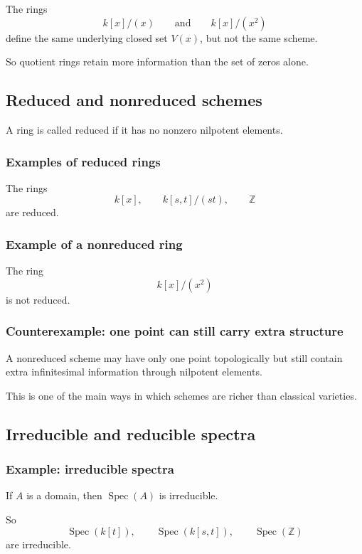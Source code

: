 \documentclass[12pt,a4paper]{article}
\theoremstyle{notespace}
\newcommand{\Spec}{\operatorname{Spec}}
\theoremstyle{definition}
\begin{document}
The rings
\[
k[x]/(x)
\qquad\text{and}\qquad
k[x]/(x^2)
\]
define the same underlying closed set \(V(x)\), but not the same scheme.

So quotient rings retain more information than the set of zeros alone.

\subsection{Reduced and nonreduced schemes}

A ring is called reduced if it has no nonzero nilpotent elements.

\subsubsection{Examples of reduced rings}

The rings
\[
k[x],\qquad k[s,t]/(st),\qquad \mathbb Z
\]
are reduced.

\subsubsection{Example of a nonreduced ring}

The ring
\[
k[x]/(x^2)
\]
is not reduced.

\subsubsection{Counterexample: one point can still carry extra structure}

A nonreduced scheme may have only one point topologically but still contain extra infinitesimal information through nilpotent elements.

This is one of the main ways in which schemes are richer than classical varieties.

\subsection{Irreducible and reducible spectra}

\subsubsection{Example: irreducible spectra}

If \(A\) is a domain, then \(\Spec(A)\) is irreducible.

So
\[
\Spec(k[t]),\qquad \Spec(k[s,t]),\qquad \Spec(\mathbb Z)
\]
are irreducible.
\end{document}
